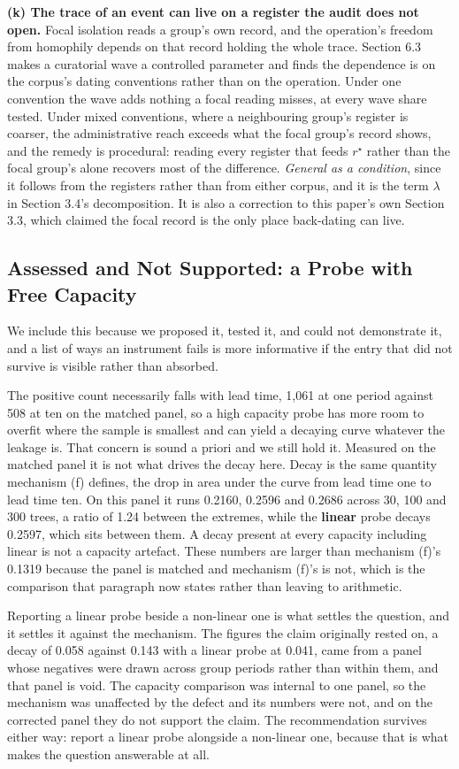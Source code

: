 \documentclass[twoside,11pt]{article}
\begin{document}
\textbf{(k) The trace of an event can live on a register the audit does not open.} Focal isolation reads a group's own record, and the operation's freedom from homophily depends on that record holding the whole trace. Section 6.3 makes a curatorial wave a controlled parameter and finds the dependence is on the corpus's dating conventions rather than on the operation. Under one convention the wave adds nothing a focal reading misses, at every wave share tested. Under mixed conventions, where a neighbouring group's register is coarser, the administrative reach exceeds what the focal group's record shows, and the remedy is procedural: reading every register that feeds \(r^{\star}\) rather than the focal group's alone recovers most of the difference. \emph{General as a condition}, since it follows from the registers rather than from either corpus, and it is the term \(\lambda\) in Section 3.4's decomposition. It is also a correction to this paper's own Section 3.3, which claimed the focal record is the only place back-dating can live.

\subsection{Assessed and Not Supported: a Probe with Free Capacity}

We include this because we proposed it, tested it, and could not demonstrate it, and a list of ways an instrument fails is more informative if the entry that did not survive is visible rather than absorbed.

The positive count necessarily falls with lead time, 1,061 at one period against 508 at ten on the matched panel, so a high capacity probe has more room to overfit where the sample is smallest and can yield a decaying curve whatever the leakage is. That concern is sound a priori and we still hold it. Measured on the matched panel it is not what drives the decay here. Decay is the same quantity mechanism (f) defines, the drop in area under the curve from lead time one to lead time ten. On this panel it runs 0.2160, 0.2596 and 0.2686 across 30, 100 and 300 trees, a ratio of 1.24 between the extremes, while the \textbf{linear} probe decays 0.2597, which sits between them. A decay present at every capacity including linear is not a capacity artefact. These numbers are larger than mechanism (f)'s 0.1319 because the panel is matched and mechanism (f)'s is not, which is the comparison that paragraph now states rather than leaving to arithmetic.

Reporting a linear probe beside a non-linear one is what settles the question, and it settles it against the mechanism. The figures the claim originally rested on, a decay of 0.058 against 0.143 with a linear probe at 0.041, came from a panel whose negatives were drawn across group periods rather than within them, and that panel is void. The capacity comparison was internal to one panel, so the mechanism was unaffected by the defect and its numbers were not, and on the corrected panel they do not support the claim. The recommendation survives either way: report a linear probe alongside a non-linear one, because that is what makes the question answerable at all.
\end{document}
